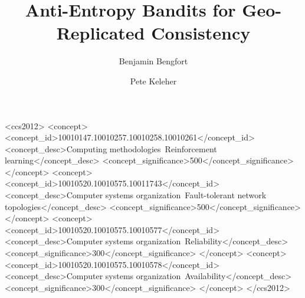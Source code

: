 \documentclass[sigconf, authordraft]{acmart}
\begin{document}
\title{Anti-Entropy Bandits for Geo-Replicated Consistency}

\author{Benjamin Bengfort}

\author{Pete Keleher}

\begin{abstract}
    
\end{abstract}

%
%
\begin{CCSXML}
<ccs2012>
<concept>
<concept_id>10010147.10010257.10010258.10010261</concept_id>
<concept_desc>Computing methodologies~Reinforcement learning</concept_desc>
<concept_significance>500</concept_significance>
</concept>
<concept>
<concept_id>10010520.10010575.10011743</concept_id>
<concept_desc>Computer systems organization~Fault-tolerant network topologies</concept_desc>
<concept_significance>500</concept_significance>
</concept>
<concept>
<concept_id>10010520.10010575.10010577</concept_id>
<concept_desc>Computer systems organization~Reliability</concept_desc>
<concept_significance>300</concept_significance>
</concept>
<concept>
<concept_id>10010520.10010575.10010578</concept_id>
<concept_desc>Computer systems organization~Availability</concept_desc>
<concept_significance>300</concept_significance>
</concept>
</ccs2012>
\end{CCSXML}





\maketitle



% 

\end{document}
